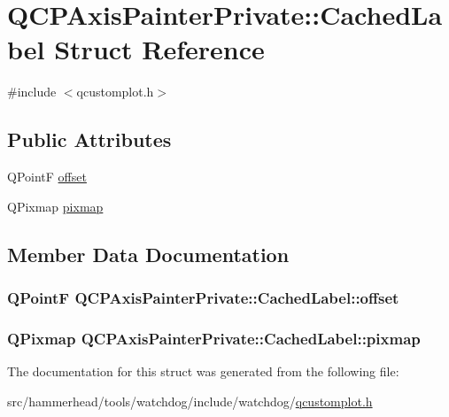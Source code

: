 \hypertarget{structQCPAxisPainterPrivate_1_1CachedLabel}{}\section{Q\+C\+P\+Axis\+Painter\+Private\+:\+:Cached\+Label Struct Reference}
\label{structQCPAxisPainterPrivate_1_1CachedLabel}


{\ttfamily \#include $<$qcustomplot.\+h$>$}

\subsection*{Public Attributes}
\begin{DoxyCompactItemize}
\item 
Q\+PointF \hyperlink{structQCPAxisPainterPrivate_1_1CachedLabel_a5f502db71c92e572f1e6f44f62c59d8e}{offset}
\item 
Q\+Pixmap \hyperlink{structQCPAxisPainterPrivate_1_1CachedLabel_a461597cbd470914a9d24b64d16037a88}{pixmap}
\end{DoxyCompactItemize}


\subsection{Member Data Documentation}
\subsubsection[{\texorpdfstring{offset}{offset}}]{\setlength{\rightskip}{0pt plus 5cm}Q\+PointF Q\+C\+P\+Axis\+Painter\+Private\+::\+Cached\+Label\+::offset}\hypertarget{structQCPAxisPainterPrivate_1_1CachedLabel_a5f502db71c92e572f1e6f44f62c59d8e}{}\label{structQCPAxisPainterPrivate_1_1CachedLabel_a5f502db71c92e572f1e6f44f62c59d8e}
\subsubsection[{\texorpdfstring{pixmap}{pixmap}}]{\setlength{\rightskip}{0pt plus 5cm}Q\+Pixmap Q\+C\+P\+Axis\+Painter\+Private\+::\+Cached\+Label\+::pixmap}\hypertarget{structQCPAxisPainterPrivate_1_1CachedLabel_a461597cbd470914a9d24b64d16037a88}{}\label{structQCPAxisPainterPrivate_1_1CachedLabel_a461597cbd470914a9d24b64d16037a88}


The documentation for this struct was generated from the following file\+:\begin{DoxyCompactItemize}
\item 
src/hammerhead/tools/watchdog/include/watchdog/\hyperlink{qcustomplot_8h}{qcustomplot.\+h}\end{DoxyCompactItemize}
